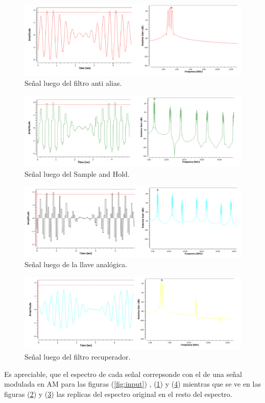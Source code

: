 \begin{figure}[H]
	\centering
	\includegraphics[width=1\textwidth]{ImagenesEjercicio7/alias.PNG}
\caption{Señal luego del filtro anti alias.}
	\label{fig:alias}
\end{figure}
\begin{figure}[H]
	\centering
	\includegraphics[width=1\textwidth]{ImagenesEjercicio7/sh.PNG}
\caption{Señal luego del Sample and Hold.}
	\label{fig:sh}
\end{figure}
\begin{figure}[H]
	\centering
	\includegraphics[width=1\textwidth]{ImagenesEjercicio7/analog.PNG}
\caption{Señal luego de la llave analógica.}
	\label{fig:analog}
\end{figure}
\begin{figure}[H]
	\centering
	\includegraphics[width=1\textwidth]{ImagenesEjercicio7/recovery.PNG}
\caption{Señal luego del filtro recuperador.}
	\label{fig:recovery}
\end{figure}
Es apreciable, que el espectro de cada señal correpsonde con el de una señal modulada en AM para las figuras (\ref{fig:input}) , (\ref{fig:alias}) y (\ref{fig:recovery}) mientras que se ve en las figuras (\ref{fig:sh}) y (\ref{fig:analog}) las replicas del espectro original en el resto del espectro.
